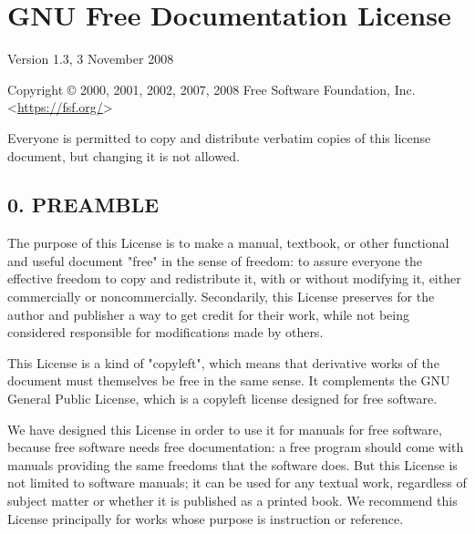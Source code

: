 \chapter{GNU Free Documentation License}
\label{chap:FDL}
Version 1.3, 3 November 2008\par
Copyright © 2000, 2001, 2002, 2007, 2008 Free Software Foundation, Inc. <\url{https://fsf.org/}> \par
Everyone is permitted to copy and distribute verbatim copies of this license document, but changing it is not allowed.
\section{0. PREAMBLE}
The purpose of this License is to make a manual, textbook, or other functional and useful document "free" in the sense of freedom: to assure everyone the effective freedom to copy and redistribute it, with or without modifying it, either commercially or noncommercially. Secondarily, this License preserves for the author and publisher a way to get credit for their work, while not being considered responsible for modifications made by others.\par
This License is a kind of "copyleft", which means that derivative works of the document must themselves be free in the same sense. It complements the GNU General Public License, which is a copyleft license designed for free software.\par
We have designed this License in order to use it for manuals for free software, because free software needs free documentation: a free program should come with manuals providing the same freedoms that the software does. But this License is not limited to software manuals; it can be used for any textual work, regardless of subject matter or whether it is published as a printed book. We recommend this License principally for works whose purpose is instruction or reference.

